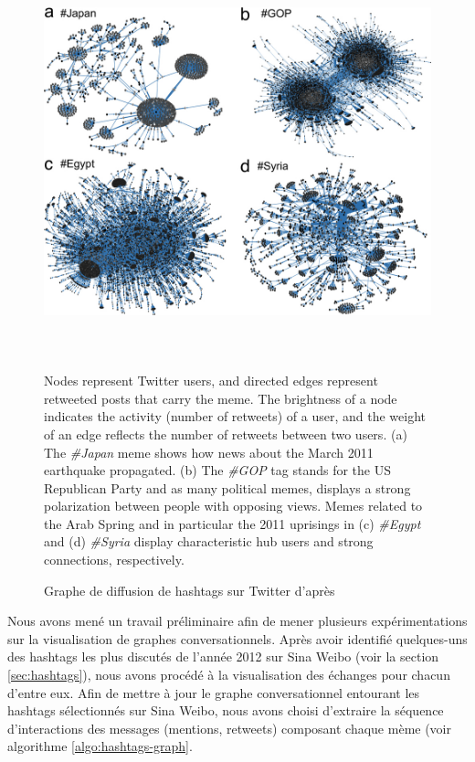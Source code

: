 \begin{figure}[ht]
    \centering
    \includegraphics[width=5.5669in,height=4.4224in]{figures/chap3/chapitre3-img10.jpg}

    Nodes represent Twitter users, and directed edges represent retweeted posts that carry the meme. The brightness of a node indicates the activity (number of retweets) of a user, and the weight of an edge reflects the number of retweets between two users. \newline
    (a) The \textit{\#Japan}  meme shows how news about the March 2011 earthquake propagated. \newline
    (b) The \textit{\#GOP} tag stands for the US Republican Party and as many political memes, displays a strong polarization between people with opposing views. \newline
    Memes related to the Arab Spring and in particular the 2011 uprisings in (c) \textit{\#Egypt} and (d) \textit{\#Syria} display characteristic hub users and strong connections, respectively.
    
    \caption{Graphe de diffusion de hashtags sur Twitter d{\textquoteright}après \citep{Weng2012} }

\end{figure}


Nous avons mené un travail préliminaire afin de mener plusieurs expérimentations sur la visualisation de graphes conversationnels. Après avoir identifié quelques-uns des hashtags les plus discutés de l{\textquoteright}année 2012 sur Sina Weibo (voir la section \ref{sec:hashtags}), nous avons procédé à la visualisation des échanges pour chacun d'entre eux. Afin de mettre à jour le graphe conversationnel entourant les hashtags sélectionnés sur Sina Weibo, nous avons choisi d{\textquoteright}extraire la séquence d{\textquoteright}interactions des messages (mentions, retweets) composant chaque mème (voir algorithme \ref{algo:hashtags-graph}.

